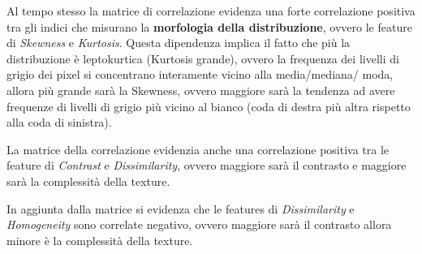 Al tempo stesso la matrice di correlazione evidenza una forte correlazione positiva
tra gli indici che misurano la \textbf{morfologia della distribuzione}, ovvero 
le feature di \textit{Skewness} e \textit{Kurtosis}. Questa dipendenza implica il 
fatto che più la distribuzione è leptokurtica (Kurtosis grande), ovvero la frequenza
dei livelli di grigio dei pixel si concentrano interamente vicino alla media/mediana/
moda, allora più grande sarà la Skewness, ovvero maggiore sarà la tendenza ad avere
frequenze di livelli di grigio più vicino al bianco (coda di destra più altra rispetto
alla coda di sinistra).

La matrice della correlazione evidenzia anche una correlazione positiva tra le 
feature di \textit{Contrast} e \textit{Dissimilarity}, ovvero maggiore sarà il 
contrasto e maggiore sarà la complessità della texture. 

In aggiunta dalla matrice si evidenza che le features di \textit{Dissimilarity}
e \textit{Homogeneity} sono correlate negativo, ovvero maggiore sarà il contrasto
allora minore è la complessità della texture.